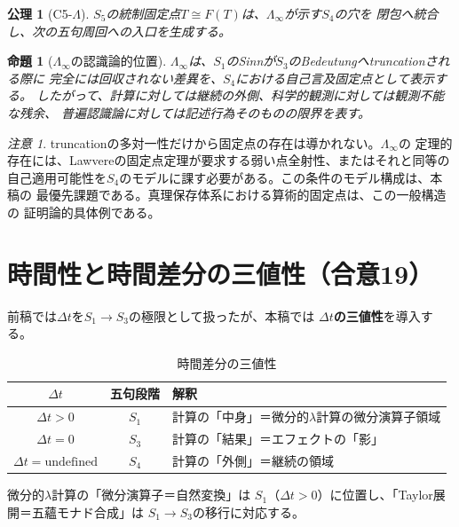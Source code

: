 \documentclass[11pt,a4paper]{ltjsarticle}
\newtheorem{proposition}[definition]{命題}
\newtheorem{axiom}[definition]{公理}
\theoremstyle{remark}
\newtheorem*{remark}{注意}
\newcommand{\dt}{\Delta t}
\newcommand{\LawvereInfinity}{\Lambda_\infty}
\begin{document}
\begin{axiom}[C5-$\Lambda$]
$S_5$の統制固定点$T\cong F(T)$は、$\LawvereInfinity$が示す$S_4$の穴を
閉包へ統合し、次の五句周回への入口を生成する。
\end{axiom}

\begin{proposition}[$\LawvereInfinity$の認識論的位置]
$\LawvereInfinity$は、$S_1$のSinnが$S_3$のBedeutungへtruncationされる際に
完全には回収されない差異を、$S_4$における自己言及固定点として表示する。
したがって、計算に対しては継続の外側、科学的観測に対しては観測不能な残余、
普遍認識論に対しては記述行為そのものの限界を表す。
\end{proposition}

\begin{remark}
truncationの多対一性だけから固定点の存在は導かれない。$\LawvereInfinity$の
定理的存在には、Lawvereの固定点定理が要求する弱い点全射性、またはそれと同等の
自己適用可能性を$S_4$のモデルに課す必要がある。この条件のモデル構成は、本稿の
最優先課題である。真理保存体系における算術的固定点は、この一般構造の
証明論的具体例である\cite{ChibaLambda2026}。
\end{remark}

\section{時間性と時間差分の三値性（合意19）}

前稿では$\dt$を$S_1\to S_3$の極限として扱ったが、本稿では
\textbf{$\dt$の三値性}を導入する。

\begin{table}[htbp]
\centering
\caption{時間差分の三値性}
\label{tab:delta-t}
\small
\begin{tabularx}{\textwidth}{@{}c c >{\raggedright\arraybackslash}X@{}}
\toprule
$\dt$ & 五句段階 & 解釈 \\
\midrule
$\dt>0$ & $S_1$ & 計算の「中身」＝微分的$\lambda$計算の微分演算子領域 \\
$\dt=0$ & $S_3$ & 計算の「結果」＝エフェクトの「影」 \\
$\dt=\mathrm{undefined}$ & $S_4$ & 計算の「外側」＝継続の領域 \\
\bottomrule
\end{tabularx}
\end{table}

微分的$\lambda$計算\cite{EhrhardRegnier2003}の「微分演算子＝自然変換」は
$S_1$（$\dt>0$）に位置し、「Taylor展開＝五蘊モナド合成」は
$S_1\to S_3$の移行に対応する。
\end{document}
